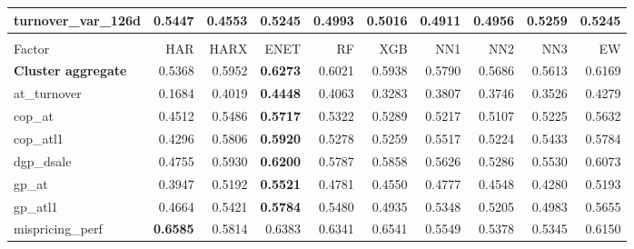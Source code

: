 \begin{longtable}{>{\raggedright\arraybackslash}p{2.6cm}rrrrrrrrr}
turnover\_var\_126d & \textbf{0.5447} & 0.4553 & 0.5245 & 0.4993 & 0.5016 & 0.4911 & 0.4956 & 0.5259 & 0.5245 \\
\hline
\multicolumn{10}{@{}l}{\textit{Panel I. Quality}} \\
\hline
Factor & HAR & HARX & ENET & RF & XGB & NN1 & NN2 & NN3 & EW \\
\hline
\textbf{Cluster aggregate} & 0.5368 & \cellcolor{blue!10}0.5952 & \textbf{\cellcolor{blue!10}0.6273} & \cellcolor{blue!10}0.6021 & \cellcolor{blue!10}0.5938 & \cellcolor{blue!10}0.5790 & \cellcolor{blue!10}0.5686 & \cellcolor{blue!10}0.5613 & \cellcolor{blue!10}0.6169 \\
at\_turnover & 0.1684 & \cellcolor{blue!10}0.4019 & \textbf{\cellcolor{blue!10}0.4448} & \cellcolor{blue!10}0.4063 & \cellcolor{blue!10}0.3283 & \cellcolor{blue!10}0.3807 & \cellcolor{blue!10}0.3746 & \cellcolor{blue!10}0.3526 & \cellcolor{blue!10}0.4279 \\
cop\_at & 0.4512 & \cellcolor{blue!10}0.5486 & \textbf{\cellcolor{blue!10}0.5717} & \cellcolor{blue!10}0.5322 & \cellcolor{blue!10}0.5289 & \cellcolor{blue!10}0.5217 & \cellcolor{blue!10}0.5107 & \cellcolor{blue!10}0.5225 & \cellcolor{blue!10}0.5632 \\
cop\_atl1 & 0.4296 & \cellcolor{blue!10}0.5806 & \textbf{\cellcolor{blue!10}0.5920} & \cellcolor{blue!10}0.5278 & \cellcolor{blue!10}0.5259 & \cellcolor{blue!10}0.5517 & \cellcolor{blue!10}0.5224 & \cellcolor{blue!10}0.5433 & \cellcolor{blue!10}0.5784 \\
dgp\_dsale & 0.4755 & \cellcolor{blue!10}0.5930 & \textbf{\cellcolor{blue!10}0.6200} & \cellcolor{blue!10}0.5787 & \cellcolor{blue!10}0.5858 & \cellcolor{blue!10}0.5626 & \cellcolor{blue!10}0.5286 & \cellcolor{blue!10}0.5530 & \cellcolor{blue!10}0.6073 \\
gp\_at & 0.3947 & \cellcolor{blue!10}0.5192 & \textbf{\cellcolor{blue!10}0.5521} & \cellcolor{blue!10}0.4781 & \cellcolor{blue!10}0.4550 & \cellcolor{blue!10}0.4777 & \cellcolor{blue!10}0.4548 & \cellcolor{blue!10}0.4280 & \cellcolor{blue!10}0.5193 \\
gp\_atl1 & 0.4664 & \cellcolor{blue!10}0.5421 & \textbf{\cellcolor{blue!10}0.5784} & \cellcolor{blue!10}0.5480 & \cellcolor{blue!10}0.4935 & \cellcolor{blue!10}0.5348 & \cellcolor{blue!10}0.5205 & \cellcolor{blue!10}0.4983 & \cellcolor{blue!10}0.5655 \\
mispricing\_perf & \textbf{0.6585} & 0.5814 & 0.6383 & 0.6341 & 0.6541 & 0.5549 & 0.5378 & 0.5345 & 0.6150 \\

\end{longtable}
